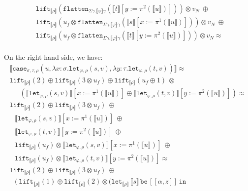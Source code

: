 \documentclass[runningheads,a4paper]{llncs}
\newcommand{\typeinterpret}[1]{\llbracket #1 \rrbracket}
\newcommand{\interpret}[1]{\llbracket #1 \rrbracket}
\newcommand{\abs}[2]{\lambda #1.#2}
\newcommand{\expair}[2]{[#1,#2]}
\newcommand{\flatten}{\mathtt{flatten}}
\newcommand{\lift}{\mathtt{lift}}
\newcommand{\xlet}[4]{\mathtt{let}_{#1}\,#2\,\mathtt{be}\,[#3]\,\mathtt{in}\,#4}
\begin{document}
\begin{itemize}
\[\begin{array}{l}
  \phantom{A}
  \lift_{\typeinterpret{\rho}}(\flatten_{\Sigma\gamma.\typeinterpret{
    \varphi}\gamma}(\interpret{t}[y:=\pi^2(\interpret{u})]))
    \otimes v_N\ \oplus \\
  \phantom{A}
  \lift_{\typeinterpret{\rho}}(u_f \otimes
    \flatten_{\Sigma\gamma.\typeinterpret{\varphi}\gamma}(
    \interpret{s}[x:=\pi^1(\interpret{u})]))
    \otimes v_N\ \oplus \\
  \phantom{A} \lift_{\typeinterpret{\rho}}(u_f \otimes
    \flatten_{\Sigma\gamma.\typeinterpret{
    \varphi}\gamma}(\interpret{t}[y:=\pi^2(\interpret{u})])) \otimes
    v_N \approx \\
  \end{array}
  \]

  On the right-hand side, we have:
  \[
  \begin{array}{l}
  \interpret{\mathtt{case}_{\sigma,\tau,\rho}(u,
  \abs{x:\sigma}{\mathtt{let}_{\varphi,\rho}(s,v)},
  \abs{y:\tau}{\mathtt{let}_{\varphi,\rho}(t,v)})} \approx \\
  \lift_{\typeinterpret{\rho}}(2) \oplus
  \lift_{\typeinterpret{\rho}}(3 \otimes u_f) \oplus
  \lift_{\typeinterpret{\rho}}(u_f \oplus 1)\ \otimes \\
  \phantom{AB}
    (\interpret{\mathtt{let}_{\varphi,\rho}(s,v)}[x:=\pi^1(
    \interpret{u})] \oplus
    \interpret{\mathtt{let}_{\varphi,\rho}(t,v)}[y:=\pi^2(
    \interpret{u})]) \approx \\
  \lift_{\typeinterpret{\rho}}(2) \oplus
  \lift_{\typeinterpret{\rho}}(3 \otimes u_f)\ \oplus \\
  \phantom{A}
  \interpret{\mathtt{let}_{\varphi,\rho}(s,v)}[x:=\pi^1(
    \interpret{u})]\ \oplus \\
  \phantom{A}
    \interpret{\mathtt{let}_{\varphi,\rho}(t,v)}[y:=\pi^2(
    \interpret{u})]\ \oplus \\
  \phantom{A}
  \lift_{\typeinterpret{\rho}}(u_f) \otimes
    \interpret{\mathtt{let}_{\varphi,\rho}(s,v)}[x:=\pi^1(
    \interpret{u})]\ \oplus \\
  \phantom{A}
  \lift_{\typeinterpret{\rho}}(u_f) \otimes
    \interpret{\mathtt{let}_{\varphi,\rho}(t,v)}[y:=\pi^2(
    \interpret{u})] \approx \\
  \lift_{\typeinterpret{\rho}}(2) \oplus
  \lift_{\typeinterpret{\rho}}(3 \otimes u_f)\ \oplus \\
  \phantom{A}
  (\ \lift_{\typeinterpret{\rho}}(1) \oplus
    \lift_{\typeinterpret{\rho}}(2) \otimes
    (\xlet{\typeinterpret{\rho}}{\interpret{s}}{\expair{\alpha}{z}}{
}
\end{array}\]
\end{itemize}
\end{document}

